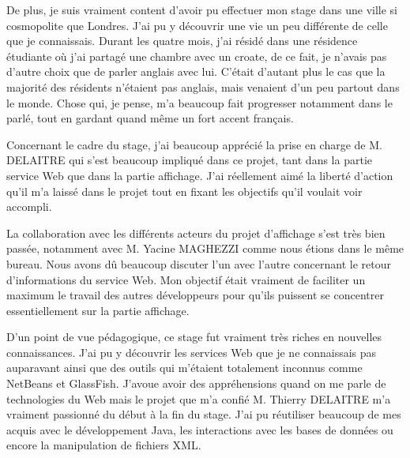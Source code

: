 De plus, je suis vraiment content d'avoir pu effectuer mon stage dans une ville si cosmopolite que Londres.
J'ai pu y d\'ecouvrir une vie un peu diff\'erente de celle que je connaissais.
Durant les quatre mois, j'ai r\'esid\'e dans une r\'esidence \'etudiante o\`u j'ai partag\'e une chambre avec un croate, de ce fait, je n'avais pas d'autre choix que de parler anglais avec lui.
C'\'etait d'autant plus le cas que la majorit\'e des r\'esidents n'\'etaient pas anglais, mais venaient d'un peu partout dans le monde.
Chose qui, je pense, m'a beaucoup fait progresser notamment dans le parl\'e, tout en gardant quand m\^eme un fort accent fran\c{c}ais.

Concernant le cadre du stage, j'ai beaucoup appr\'eci\'e la prise en charge de M. DELAITRE qui s'est beaucoup impliqu\'e dans ce projet, tant dans la partie service Web que dans la partie affichage.
J'ai r\'eellement aim\'e la libert\'e d'action qu'il m'a laiss\'e dans le projet tout en fixant les objectifs qu'il voulait voir accompli.

La collaboration avec les diff\'erents acteurs du projet d'affichage s'est tr\`es bien pass\'ee, notamment avec M. Yacine MAGHEZZI comme nous \'etions dans le m\^eme bureau.
Nous avons d\^u beaucoup discuter l'un avec l'autre concernant le retour d'informations du service Web.
Mon objectif \'etait vraiment de faciliter un maximum le travail des autres d\'eveloppeurs pour qu'ils puissent se concentrer essentiellement sur la partie affichage.

D'un point de vue p\'edagogique, ce stage fut vraiment tr\`es riches en nouvelles connaissances.
J'ai pu y d\'ecouvrir les services Web que je ne connaissais pas auparavant ainsi que des outils qui m'\'etaient totalement inconnus comme NetBeans et GlassFish.
J'avoue avoir des appr\'ehensions quand on me parle de technologies du Web mais le projet que m'a confi\'e M. Thierry DELAITRE m'a vraiment passionn\'e du d\'ebut \`a la fin du stage.
J'ai pu r\'eutiliser beaucoup de mes acquis avec le d\'eveloppement Java, les interactions avec les bases de donn\'ees ou encore la manipulation de fichiers XML.



\clearpage
